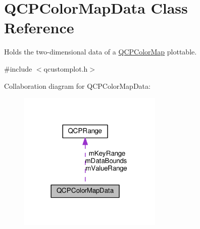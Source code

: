 \hypertarget{classQCPColorMapData}{}\section{Q\+C\+P\+Color\+Map\+Data Class Reference}
\label{classQCPColorMapData}


Holds the two-\/dimensional data of a \hyperlink{classQCPColorMap}{Q\+C\+P\+Color\+Map} plottable.  




{\ttfamily \#include $<$qcustomplot.\+h$>$}



Collaboration diagram for Q\+C\+P\+Color\+Map\+Data\+:\nopagebreak
\begin{figure}[H]
\begin{center}
\leavevmode
\includegraphics[width=194pt]{classQCPColorMapData__coll__graph}
\end{center}
\end{figure}
